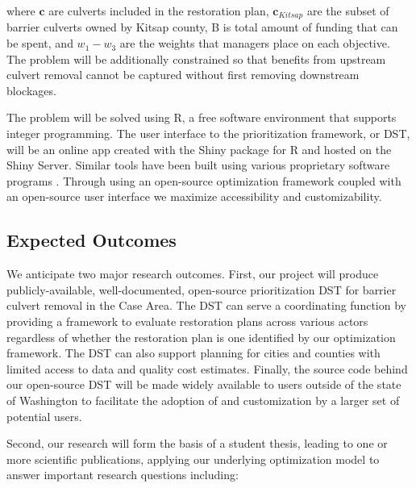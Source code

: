 \documentclass[12pt]{elsarticle}
\begin{document}
	
	where $\boldsymbol{c}$ are culverts included in the restoration plan, $\boldsymbol{c}_{Kitsap}$ are the subset of barrier culverts owned by Kitsap county, B is total amount of funding that can be spent, and $w_1-w_3$ are the weights that managers place on each objective. The problem will be additionally constrained so that benefits from upstream culvert removal cannot be captured without first removing downstream blockages.
	
	The problem will be solved using R, a free software environment that supports integer programming. The user interface to the prioritization framework, or DST, will be an online app created with the Shiny package for R and hosted on the Shiny Server. Similar tools have been built using various proprietary software programs \citep{ohanley_optipass_2015, moody_pet_2017, mcmanamay_commonalities_2019}. Through using an open-source optimization framework coupled with an open-source user interface we maximize accessibility and customizability.  
	
	\subsection{Expected Outcomes} %
	
	We anticipate two major research outcomes. First, our project will produce publicly-available, well-documented, open-source prioritization DST for barrier culvert removal in the Case Area. The DST can serve a coordinating function by providing a framework to evaluate restoration plans across various actors regardless of whether the restoration plan is one identified by our optimization framework. The DST can also support planning for cities and counties with limited access to data and quality cost estimates. Finally, the source code behind our open-source DST will be made widely available to users outside of the state of Washington to facilitate the adoption of and customization by a larger set of potential users. 
	
	Second, our research will form the basis of a student thesis, leading to one or more scientific publications, applying our underlying optimization model to answer important research questions including:
	
\end{document}
